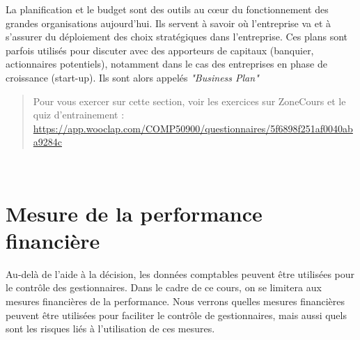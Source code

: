 \documentclass{tufte-handout}
\begin{document}
La planification et le budget sont des outils au cœur du fonctionnement des grandes organisations aujourd'hui. Ils servent à savoir où l'entreprise va et à s'assurer du déploiement des choix stratégiques dans l'entreprise. Ces plans sont parfois utilisés pour discuter avec des apporteurs de capitaux (banquier, actionnaires potentiels), notamment dans le cas des entreprises en phase de croissance (start-up). Ils sont alors appelés \emph{"Business Plan"}\\

\begin{quote}
Pour vous exercer sur cette section, voir les exercices sur ZoneCours et le quiz d'entrainement : \url{https://app.wooclap.com/COMP50900/questionnaires/5f6898f251af0040aba9284c}\\
\end{quote}

\clearpage\\
\section{Mesure de la performance financière}
\label{sec:orgdd01546}
Au-delà de l'aide à la décision, les données comptables peuvent être utilisées pour le contrôle des gestionnaires. Dans le cadre de ce cours, on se limitera aux mesures financières de la performance. Nous verrons quelles mesures financières peuvent être utilisées pour faciliter le contrôle de gestionnaires, mais aussi quels sont les risques liés à l'utilisation de ces mesures.\\
\end{document}
